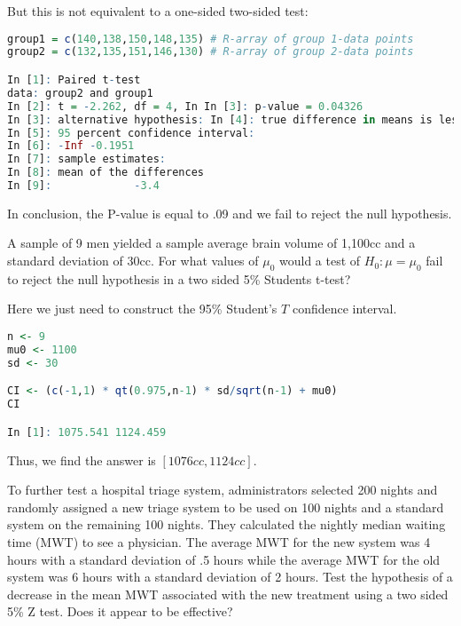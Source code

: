 \documentclass{homework}
\begin{document}
But this is not equivalent to a one-sided two-sided test:

\begin{lstlisting}[language=R]
group1 = c(140,138,150,148,135) # R-array of group 1-data points
group2 = c(132,135,151,146,130) # R-array of group 2-data points

In [1]: Paired t-test
data: group2 and group1
In [2]: t = -2.262, df = 4, In In [3]: p-value = 0.04326
In [3]: alternative hypothesis: In [4]: true difference in means is less than 0
In [5]: 95 percent confidence interval:
In [6]: -Inf -0.1951
In [7]: sample estimates:
In [8]: mean of the differences
In [9]:             -3.4
\end{lstlisting}

In conclusion, the P-value is equal to .09 and we fail to reject the null hypothesis. \\ 

\begin{tcolorbox}[title=Question 3]
A sample of 9 men yielded a sample average brain volume of 1,100cc and a standard deviation of 30cc. For what values of $\mu_0$ would a test of $H_0: \mu = \mu_0$  fail to reject the null hypothesis in a two sided 5\% Students t-test?
\end{tcolorbox}

Here we just need to construct the 95\% Student's $T$ confidence interval.

\begin{lstlisting}[language=R]
n <- 9
mu0 <- 1100
sd <- 30

CI <- (c(-1,1) * qt(0.975,n-1) * sd/sqrt(n-1) + mu0)
CI

In [1]: 1075.541 1124.459
\end{lstlisting}

Thus, we find the answer is $[1076cc, 1124 cc]$. 

\clearpage

\begin{tcolorbox}[title=Question 4]
To further test a hospital triage system, administrators selected 200 nights and randomly assigned a new triage system to be used on 100 nights and a standard system on the remaining 100 nights. They calculated the nightly median waiting time (MWT) to see a physician. The average MWT for the new system was 4 hours with a standard deviation of .5 hours while the average MWT for the old system was 6 hours with a standard deviation of 2 hours. Test the hypothesis of a decrease in the mean MWT associated with the new treatment using a two sided 5\% Z test. Does it appear to be effective?
\end{tcolorbox}
\end{document}
